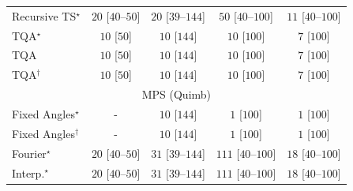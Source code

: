 \begin{tabular}{l|cccc|}
Recursive TS$^\star$ & {\cellcolor[HTML]{F4FBF1}} \color[HTML]{000000} $20$ [$40$--$50$] & {\cellcolor[HTML]{F4FBF1}} \color[HTML]{000000} $20$ [$39$--$144$] & {\cellcolor[HTML]{EEF8EA}} \color[HTML]{000000} $50$ [$40$--$100$] & {\cellcolor[HTML]{F5FBF3}} \color[HTML]{000000} $11$ [$40$--$100$] \\
TQA$^\star$ & {\cellcolor[HTML]{F6FCF4}} \color[HTML]{000000} $10$ [$50$] & {\cellcolor[HTML]{F6FCF4}} \color[HTML]{000000} $10$ [$144$] & {\cellcolor[HTML]{F6FCF4}} \color[HTML]{000000} $10$ [$100$] & {\cellcolor[HTML]{F6FCF4}} \color[HTML]{000000} $7$ [$100$] \\
TQA & {\cellcolor[HTML]{F6FCF4}} \color[HTML]{000000} $10$ [$50$] & {\cellcolor[HTML]{F6FCF4}} \color[HTML]{000000} $10$ [$144$] & {\cellcolor[HTML]{F6FCF4}} \color[HTML]{000000} $10$ [$100$] & {\cellcolor[HTML]{F6FCF4}} \color[HTML]{000000} $7$ [$100$] \\
TQA$^\dagger$ & {\cellcolor[HTML]{F6FCF4}} \color[HTML]{000000} $10$ [$50$] & {\cellcolor[HTML]{F6FCF4}} \color[HTML]{000000} $10$ [$144$] & {\cellcolor[HTML]{F6FCF4}} \color[HTML]{000000} $10$ [$100$] & {\cellcolor[HTML]{F6FCF4}} \color[HTML]{000000} $7$ [$100$] \\
\cline{1-5}
\multicolumn{5}{c}{\rule{0pt}{8pt}MPS (Quimb)} \\
\midrule
Fixed Angles$^\star$ & {\cellcolor[HTML]{000000}} \color[HTML]{F1F1F1} {\cellcolor{white}} \color{black} - & {\cellcolor[HTML]{F6FCF4}} \color[HTML]{000000} $10$ [$144$] & {\cellcolor[HTML]{F7FCF5}} \color[HTML]{000000} $1$ [$100$] & {\cellcolor[HTML]{F7FCF5}} \color[HTML]{000000} $1$ [$100$] \\
Fixed Angles$^\dagger$ & {\cellcolor[HTML]{000000}} \color[HTML]{F1F1F1} {\cellcolor{white}} \color{black} - & {\cellcolor[HTML]{F6FCF4}} \color[HTML]{000000} $10$ [$144$] & {\cellcolor[HTML]{F7FCF5}} \color[HTML]{000000} $1$ [$100$] & {\cellcolor[HTML]{F7FCF5}} \color[HTML]{000000} $1$ [$100$] \\
Fourier$^\star$ & {\cellcolor[HTML]{F4FBF1}} \color[HTML]{000000} $20$ [$40$--$50$] & {\cellcolor[HTML]{F2FAEF}} \color[HTML]{000000} $31$ [$39$--$144$] & {\cellcolor[HTML]{E1F3DC}} \color[HTML]{000000} $111$ [$40$--$100$] & {\cellcolor[HTML]{F4FBF2}} \color[HTML]{000000} $18$ [$40$--$100$] \\
Interp.$^\star$ & {\cellcolor[HTML]{F4FBF1}} \color[HTML]{000000} $20$ [$40$--$50$] & {\cellcolor[HTML]{F2FAEF}} \color[HTML]{000000} $31$ [$39$--$144$] & {\cellcolor[HTML]{E1F3DC}} \color[HTML]{000000} $111$ [$40$--$100$] & {\cellcolor[HTML]{F4FBF2}} \color[HTML]{000000} $18$ [$40$--$100$] \\

\end{tabular}
